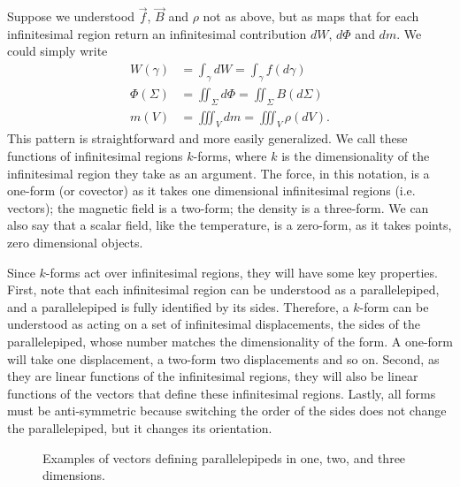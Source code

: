 Suppose we understood $\vec{f}$, $\vec{B}$ and $\rho$ not as above, but as maps that for each infinitesimal region return an infinitesimal contribution $dW$, $d\Phi$ and $dm$. We could simply write
\begin{equation*}
	\begin{aligned}
		W(\gamma) &= \int_\gamma dW = \int_\gamma f(d\gamma) \\
		\Phi(\Sigma) &= \iint_\Sigma d\Phi = \iint_\Sigma B(d\Sigma) \\
		m(V) &= \iiint_V dm = \iiint_V \rho(dV).
	\end{aligned}
\end{equation*}
This pattern is straightforward and more easily generalized. We call these functions of infinitesimal regions $k$-forms, where $k$ is the dimensionality of the infinitesimal region they take as an argument. The force, in this notation, is a one-form (or covector) as it takes one dimensional infinitesimal regions (i.e. vectors); the magnetic field is a two-form; the density is a three-form. We can also say that a scalar field, like the temperature, is a zero-form, as it takes points, zero dimensional objects.

Since $k$-forms act over infinitesimal regions, they will have some key properties.  First, note that each infinitesimal region can be understood as a parallelepiped, and a parallelepiped is fully identified by its sides. Therefore, a $k$-form can be understood as acting on a set of infinitesimal displacements, the sides of the parallelepiped, whose number matches the dimensionality of the form. A one-form will take one displacement, a two-form two displacements and so on. Second, as they are linear functions of the infinitesimal regions, they will also be linear functions of the vectors that define these infinitesimal regions. Lastly, all forms must be anti-symmetric because switching the order of the sides does not change the parallelepiped, but it changes its orientation.

\begin{figure}
	\centering
	\hspace{1cm}
	\hspace{1cm}
	\caption{Examples of vectors defining parallelepipeds in one, two, and three dimensions.}
\end{figure}

